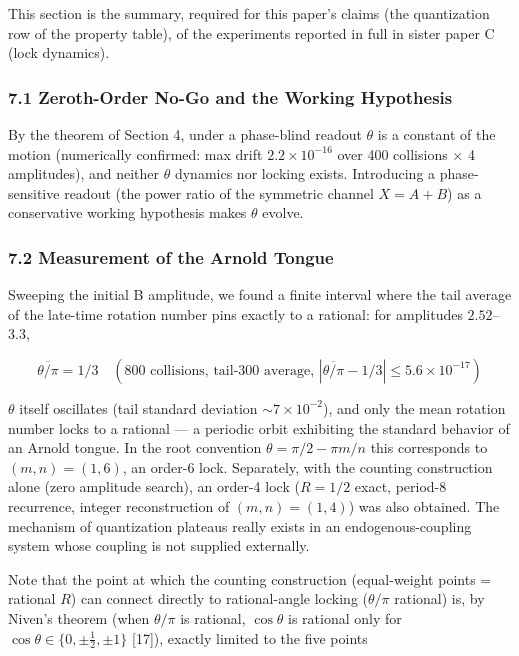\documentclass[
  a4paper,
]{article}
\begin{document}
This section is the summary, required for this paper's claims (the
quantization row of the property table), of the experiments reported in
full in sister paper C (lock dynamics).

\subsubsection{7.1 Zeroth-Order No-Go and the Working
Hypothesis}\label{zeroth-order-no-go-and-the-working-hypothesis}

By the theorem of Section 4, under a phase-blind readout \(\theta\) is a
constant of the motion (numerically confirmed: max drift
\(2.2\times10^{-16}\) over 400 collisions × 4 amplitudes), and neither
\(\theta\) dynamics nor locking exists. Introducing a phase-sensitive
readout (the power ratio of the symmetric channel \(X=A+B\)) as a
conservative working hypothesis makes \(\theta\) evolve.

\subsubsection{7.2 Measurement of the Arnold
Tongue}\label{measurement-of-the-arnold-tongue}

Sweeping the initial B amplitude, we found a finite interval where the
tail average of the late-time rotation number pins exactly to a
rational: for amplitudes \(2.52\)--\(3.3\),

\[
\overline{\theta/\pi}=1/3
\quad(\text{800 collisions, tail-300 average, }|{\overline{\theta/\pi}}-1/3|\le5.6\times10^{-17})
\]

\(\theta\) itself oscillates (tail standard deviation
\(\sim7\times10^{-2}\)), and only the mean rotation number locks to a
rational --- a periodic orbit exhibiting the standard behavior of an
Arnold tongue. In the root convention \(\theta=\pi/2-\pi m/n\) this
corresponds to \((m,n)=(1,6)\), an order-6 lock. Separately, with the
counting construction alone (zero amplitude search), an order-4 lock
(\(R=1/2\) exact, period-8 recurrence, integer reconstruction of
\((m,n)=(1,4)\)) was also obtained. The mechanism of quantization
plateaus really exists in an endogenous-coupling system whose coupling
is not supplied externally.

Note that the point at which the counting construction (equal-weight
points = rational \(R\)) can connect directly to rational-angle locking
(\(\theta/\pi\) rational) is, by Niven's theorem (when \(\theta/\pi\) is
rational, \(\cos\theta\) is rational only for
\(\cos\theta\in\{0,\pm\tfrac12,\pm1\}\) {[}17{]}), exactly limited to
the five points
\end{document}
